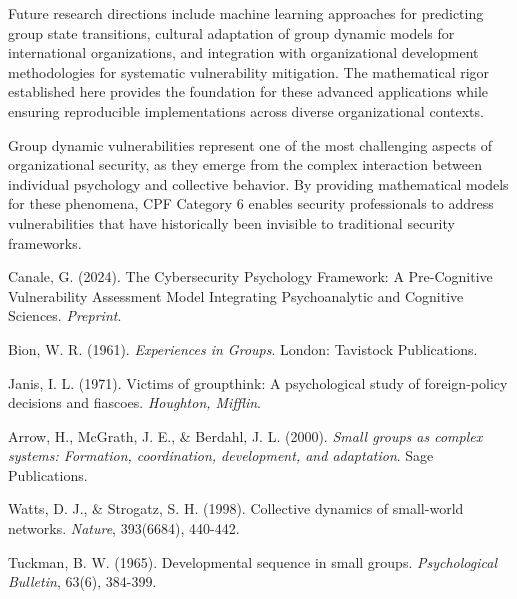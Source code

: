 \documentclass[11pt,a4paper]{article}
\begin{document}
Future research directions include machine learning approaches for predicting group state transitions, cultural adaptation of group dynamic models for international organizations, and integration with organizational development methodologies for systematic vulnerability mitigation. The mathematical rigor established here provides the foundation for these advanced applications while ensuring reproducible implementations across diverse organizational contexts.

Group dynamic vulnerabilities represent one of the most challenging aspects of organizational security, as they emerge from the complex interaction between individual psychology and collective behavior. By providing mathematical models for these phenomena, CPF Category 6 enables security professionals to address vulnerabilities that have historically been invisible to traditional security frameworks.

\begin{thebibliography}{9}

Canale, G. (2024). The Cybersecurity Psychology Framework: A Pre-Cognitive Vulnerability Assessment Model Integrating Psychoanalytic and Cognitive Sciences. \textit{Preprint}.

Bion, W. R. (1961). \textit{Experiences in Groups}. London: Tavistock Publications.

Janis, I. L. (1971). Victims of groupthink: A psychological study of foreign-policy decisions and fiascoes. \textit{Houghton, Mifflin}.

Arrow, H., McGrath, J. E., \& Berdahl, J. L. (2000). \textit{Small groups as complex systems: Formation, coordination, development, and adaptation}. Sage Publications.

Watts, D. J., \& Strogatz, S. H. (1998). Collective dynamics of small-world networks. \textit{Nature}, 393(6684), 440-442.

Tuckman, B. W. (1965). Developmental sequence in small groups. \textit{Psychological Bulletin}, 63(6), 384-399.

\end{thebibliography}
\end{document}
